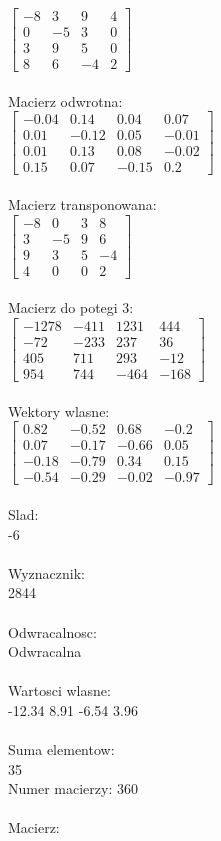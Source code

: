 \documentclass[a4paper,12pt]{article}
\begin{document}
$\begin{bmatrix} -8&3&9&4\\0&-5&3&0\\3&9&5&0\\8&6&-4&2 \end{bmatrix}$
\\
\\
Macierz odwrotna:\\

$\begin{bmatrix} -0.04&0.14&0.04&0.07\\0.01&-0.12&0.05&-0.01\\0.01&0.13&0.08&-0.02\\0.15&0.07&-0.15&0.2 \end{bmatrix}$
\\
\\
Macierz transponowana:\\

$\begin{bmatrix} -8&0&3&8\\3&-5&9&6\\9&3&5&-4\\4&0&0&2 \end{bmatrix}$
\\
\\
Macierz do potegi 3:\\

$\begin{bmatrix} -1278&-411&1231&444\\-72&-233&237&36\\405&711&293&-12\\954&744&-464&-168 \end{bmatrix}$
\\
\\
Wektory wlasne:\\

$\begin{bmatrix} 0.82&-0.52&0.68&-0.2\\0.07&-0.17&-0.66&0.05\\-0.18&-0.79&0.34&0.15\\-0.54&-0.29&-0.02&-0.97 \end{bmatrix}$
\\
\\
Slad:\\
-6
\\
\\
Wyznacznik:\\
2844
\\
\\
Odwracalnosc:\\
Odwracalna
\\
\\
Wartosci wlasne:\\
-12.34 8.91 -6.54 3.96
\\
\\
Suma elementow:\\
35
\\
\newpage
Numer macierzy:
360
\\
\\
Macierz:\\
\end{document}

